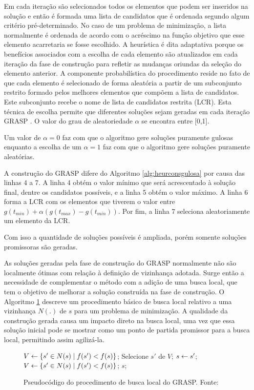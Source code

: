 Em cada iteração são selecionados todos os elementos que podem ser
inseridos na solução e então é formada uma lista de candidatos que é ordenada
segundo algum critério pré-determinado. No caso de um problema de
minimização, a lista normalmente é ordenada de acordo com o acréscimo na função
objetivo que esse elemento acarretaria se fosse escolhido. A
heurística é dita adaptativa porque os benefícios associados com a escolha de
cada elemento são atualizados em cada iteração da fase de construção para
refletir as mudanças oriundas da seleção do elemento anterior. A componente
probabilística do procedimento reside no fato de que cada elemento é
selecionado de forma aleatória a partir de um subconjunto restrito formado
pelos melhores elementos que compõem a lista de candidatos. Este subconjunto
recebe o nome de lista de candidatos restrita (LCR). Esta técnica de escolha
permite que diferentes soluções sejam geradas em cada iteração GRASP
\cite{notasmarcone}. O valor do grau de aleatoriedade $\alpha$ se encontra
entre [0,1].

Um valor de $\alpha = 0$ faz com que o algoritmo gere soluções puramente
gulosas enquanto a escolha de um $\alpha = 1$ faz com que o algoritmo gere
soluções puramente aleatórias.
 
A construção do GRASP difere do Algoritmo \ref{alg:heurconsgulosa} por causa
das linhas 4 a 7. A linha 4 obtém o valor mínimo que será acrescentado à
solução final, dentre os candidatos possíveis, e a linha 5 obtém o valor máximo.
A linha 6 forma a LCR com os elementos que tiverem o valor entre $g(t_{min}) +
\alpha(g(t_{max}) - g(t_{min}))$. Por fim, a linha 7 seleciona aleatoriamente um
elemento da LCR.

Com isso a quantidade de soluções possíveis é ampliada, porém somente soluções
promissoras são geradas.

As soluções geradas pela fase de construção do GRASP normalmente não são
localmente ótimas com relação à definição de vizinhança adotada. Surge então a
necessidade de complementar o método com a adição de uma busca local, que tem
o objetivo de melhorar a solução construída na fase de construção. O Algoritmo
\ref{alg:grasplocal} descreve um procedimento básico de busca local relativo a
uma vizinhança $N(.)$ de $s$ para um problema de minimização. A qualidade da
construção gerada causa um impacto direto na busca local, uma vez que essa
solução inicial pode se mostrar como um ponto de partida promissor para a busca
local, permitindo assim agilizá-la.
 
\begin{figure}[h]
\caption{Pseudocódigo do procedimento de busca local do GRASP. \newline
\mbox{Fonte:
\cite{resende1995}}}\label{alg:grasplocal}
\begin{programma}
\STATE $V \leftarrow \{s{'} \in N(s) \mid f(s{'}) < f(s)\}$;
\STATE Selecione $s{'}$ de $V$;
\STATE $s \leftarrow s{'}$;
\STATE $V \leftarrow \{s{'} \in N(s) \mid f(s{'}) < f(s)\}$;
\ENDWHILE
\STATE\RETURN $s$;
\ENDALGORITHM
\end{programma}
\end{figure}

